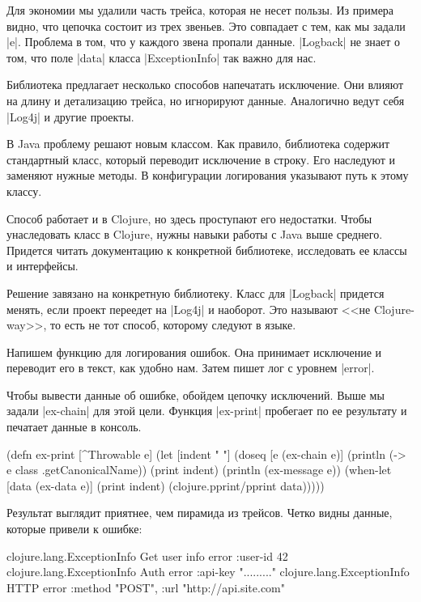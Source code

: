 Для экономии мы удалили часть трейса, которая не несет пользы. Из примера видно,
что цепочка состоит из трех звеньев. Это совпадает с тем, как мы задали
\spverb|e|. Проблема в том, что у каждого звена пропали данные. \spverb|Logback|
не знает о том, что поле \spverb|data| класса \spverb|ExceptionInfo| так важно
для нас.

Библиотека предлагает несколько способов напечатать исключение. Они влияют на
длину и детализацию трейса, но игнорируют данные. Аналогично ведут себя
\spverb|Log4j| и другие проекты.

В Java проблему решают новым классом. Как правило, библиотека содержит
стандартный класс, который переводит исключение в строку. Его наследуют и
заменяют нужные методы. В конфигурации логирования указывают путь к этому
классу.

Способ работает и в Clojure, но здесь проступают его недостатки. Чтобы
унаследовать класс в Clojure, нужны навыки работы с Java выше среднего. Придется
читать документацию к конкретной библиотеке, исследовать ее классы и интерфейсы.

Решение завязано на конкретную библиотеку. Класс для \spverb|Logback| придется
менять, если проект переедет на \spverb|Log4j| и наоборот. Это называют <<не
Clojure-way>>, то есть не тот способ, которому следуют в языке.

Напишем функцию для логирования ошибок. Она принимает исключение и переводит его
в текст, как удобно нам. Затем пишет лог с уровнем \spverb|error|.

Чтобы вывести данные об ошибке, обойдем цепочку исключений. Выше мы задали
\spverb|ex-chain| для этой цели. Функция \spverb|ex-print| пробегает по ее
результату и печатает данные в консоль.

\begin{english}
  \begin{clojure}
(defn ex-print
  [^Throwable e]
  (let [indent "  "]
    (doseq [e (ex-chain e)]
      (println (-> e class .getCanonicalName))
      (print indent)
      (println (ex-message e))
      (when-let [data (ex-data e)]
        (print indent)
        (clojure.pprint/pprint data)))))
  \end{clojure}
\end{english}

Результат выглядит приятнее, чем пирамида из трейсов. Четко видны данные,
которые привели к ошибке:

\begin{english}
  \begin{clojure}
clojure.lang.ExceptionInfo
  Get user info error
  {:user-id 42}
clojure.lang.ExceptionInfo
  Auth error
  {:api-key "........."}
clojure.lang.ExceptionInfo
  HTTP error
  {:method "POST", :url "http://api.site.com"}
  \end{clojure}
\end{english}

